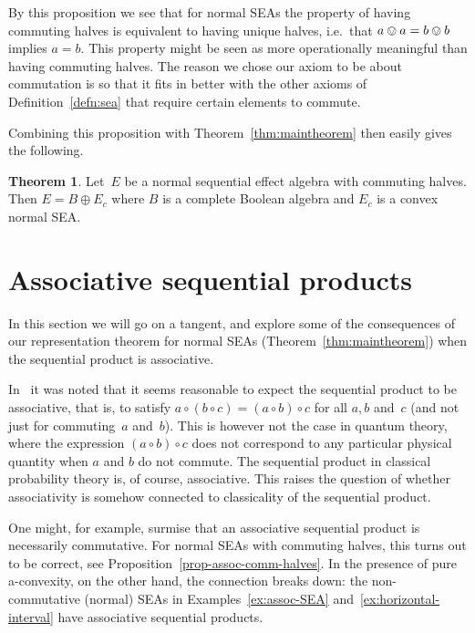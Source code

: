 \documentclass[a4paper, onecolumn, accepted=2020-12-22]{quantumarticle}
\newcommand{\mult}{\mathop{\circ}}
\newcounter{counter}
\theoremstyle{definition}
\newtheorem{theorem}[counter]{Theorem}
\begin{document}
By this proposition we see that for normal SEAs the property of having commuting halves is equivalent to having unique halves, i.e.~that $a\ovee a = b\ovee b$ implies $a=b$. This property might be seen as more operationally meaningful than having commuting halves. The reason we chose our axiom to be about commutation is so that it fits in better with the other axioms of Definition~\ref{defn:sea} that require certain elements to commute.

Combining this proposition with Theorem~\ref{thm:maintheorem} then easily gives the following.

\begin{theorem}\label{thm:commuting-halves}
    Let~$E$ be a normal sequential effect algebra with commuting halves. Then $E= B\oplus E_c$ where $B$ is a complete
    Boolean algebra and $E_c$ is a convex normal SEA.
\end{theorem}

\section{Associative sequential products}\label{sec:assoc}

In this section we will go on a tangent, and explore some of the
consequences 
of our representation theorem for normal SEAs (Theorem~\ref{thm:maintheorem})
when the sequential product is associative.

In~\cite{gudder2001sequential} it was noted that it seems
reasonable to expect the sequential product 
to be associative,
that is,
to satisfy $a\mult(b\mult c) = (a\mult b)\mult c$ 
for all $a,b$ and~$c$
(and not just for commuting~$a$ and~$b$).
This is however not the case in quantum theory, 
where the expression $(a\mult b)\mult c$ 
does not correspond to 
any particular physical quantity when $a$ and $b$ do not commute. 
The sequential product in classical probability theory is, of course,
associative. 
This raises the question of whether associativity 
is somehow connected to classicality
of the sequential product.

One might, for example, surmise that
an associative sequential product is necessarily commutative.
For normal SEAs with commuting halves,
this turns out to be correct, see Proposition~\ref{prop-assoc-comm-halves}.
In the presence
of pure a-convexity, on the other hand,
the connection breaks down:
the non-commutative (normal) SEAs in
Examples~\ref{ex:assoc-SEA} and~\ref{ex:horizontal-interval}
have associative sequential products.
\end{document}
